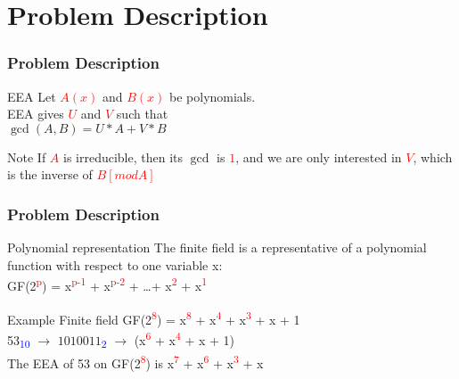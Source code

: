 \documentclass[12pt]{beamer}
\def\SP#1{\textsuperscript{\textcolor{red}{#1}}}
\def\SB#1{\textsubscript{\textcolor{blue}{#1}}}
\begin{document}
\section{Problem Description}
\begin{frame}
\frametitle{Problem Description}
	\begin{block}{EEA}
		Let \textcolor{red}{$A(x)$} and \textcolor{red}{$B(x)$} be polynomials.\\
		EEA gives \textcolor{red}{$U$} and \textcolor{red}{$V$} such that\\
		$\gcd{(A, B)} = U*A + V*B$
	\end{block}
	\begin{block}{Note}
	If \textcolor{red}{$A$} is irreducible, then its $\gcd$ is \textcolor{red}{$1$}, and we are only
	interested in \textcolor{red}{$V$}, which is the inverse of \textcolor{red}{$B [mod A]$}
	\end{block}
\end{frame}
\begin{frame}
\frametitle{Problem Description}
	\begin{block}{Polynomial representation}
	  	The finite field is a representative of a polynomial function with respect to one variable x: \\
	  	GF(2\SP{p}) = x\SP{p-1} + x\SP{p-2} + \dots + x\SP{2} + x\SP{1}
	\end{block}
	\begin{block}{Example}
		Finite field GF(2\SP{8}) = x\SP{8} + x\SP{4} + x\SP{3} + x + 1 \\
		53\SB{10} $\rightarrow$ $1010011$\SB{2} $\rightarrow$ (x\SP{6} + x\SP{4} + x + 1) \\
		The EEA of 53 on GF(2\SP{8}) is x\SP{7} + x\SP{6} + x\SP{3} + x	 
	 \end{block}
\end{frame}
\end{document}
